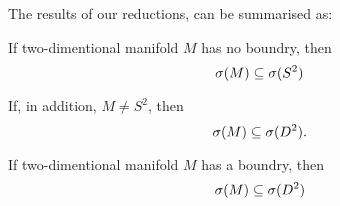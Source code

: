 

The results of our reductions, can be summarised as:
\begin{observation}\label{sum of spectras}
If two-dimentional manifold $M$ has no boundry, then
\begin{equation} 
{{\sigma}(M)} \subseteq {{\sigma}(S^2)} 
\end{equation} 

If, in addition, $M \neq S^2$, then 
\begin{equation} 
{{\sigma}(M)} \subseteq {{\sigma}(D^2)}. 
\end{equation}

\end{observation}
\begin{observation}
If two-dimentional manifold  $M$ has a boundry, then 
\begin{equation}
{{\sigma}(M)} \subseteq {{\sigma}(D^2)}
\end{equation}
\end{observation}

